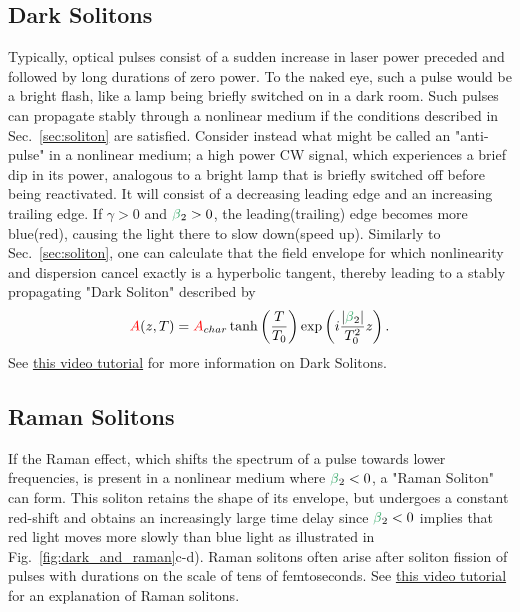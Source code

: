 \subsection{Dark Solitons} 
Typically, optical pulses consist of a sudden increase in laser power preceded and followed by long durations of zero power. To the naked eye, such a pulse would be a bright flash, like a lamp being briefly switched on in a dark room. Such pulses can propagate stably through a nonlinear medium if the conditions described in Sec.~\ref{sec:soliton} are satisfied. Consider instead what might be called an "anti-pulse" in a nonlinear medium; a high power CW signal, which experiences a brief dip in its power, analogous to a bright lamp that is briefly switched off before being reactivated. It will consist of a decreasing leading edge and an increasing trailing edge. If $\gamma>0$ and $\betag_2>0$, the leading(trailing) edge becomes more blue(red), causing the light there to slow down(speed up). Similarly to Sec.~\ref{sec:soliton}, one can calculate that the field envelope for which nonlinearity and dispersion cancel exactly is a hyperbolic tangent, thereby leading to a stably propagating "Dark Soliton" described by 
\begin{align}
    \A(z,T) = \A_{char}\tanh\left(\frac{T}{T_0}\right)\exp\left(i\frac{|\betag_2|}{T_0^2}z \right).
\end{align}
See \href{https://youtu.be/MrNfI1_eTZ0}{this video tutorial} for more information on Dark Solitons.


\subsection{Raman Solitons}
If the Raman effect, which shifts the spectrum of a pulse towards lower frequencies, is present in a nonlinear medium where $\betag_2<0$, a "Raman Soliton" can form. This soliton retains the shape of its envelope, but undergoes a constant red-shift and obtains an increasingly large time delay since $\betag_2<0$ implies that red light moves more slowly than blue light as illustrated in Fig.~\ref{fig:dark_and_raman}c-d). Raman solitons often arise after soliton fission of pulses with durations on the scale of tens of femtoseconds. See \href{https://www.youtube.com/watch?v=K33YUfegL1w}{this video tutorial} for an explanation of Raman solitons.

